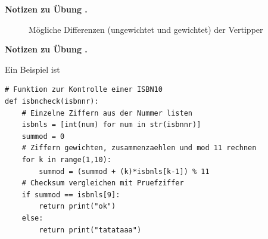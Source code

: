 \documentclass[%
11pt,%
twoside,%
titlepage,%
swissgerman,%
headsepline%
]{scrartcl}
\newcommand{\faReturnGray}{\textcolor{gray}{\faMailReply}} %
\theoremstyle{definition}
\theoremstyle{plain}
\newcommand{\concatueb}[1]{ueb:#1}%
\newcommand{\concatlsg}[1]{lsg:#1}%
\newcounter{uebcounter}[section]
\renewcommand{\theuebcounter}{\thesection.\arabic{uebcounter}}  %
\newenvironment{lsg}[1]{%
    \par\noindent\textbf{Notizen zu Übung \theuebcounter\label{\concatlsg{#1}}}
    \hfill\hyperref[\concatueb{#1}]{\faReturnGray}\par %
}{%
    \par%
}
\begin{document}
\begin{lsg}{isbn}
\begin{enumerate}[a)]
        \begin{figure}
            \centering
            \caption{Mögliche Differenzen (ungewichtet und gewichtet) der Vertipper}
            \label{fig:doublevertipper}
        \end{figure}
    \end{enumerate}
\end{lsg}
\begin{lsg}{isbnpython}
Ein Beispiel ist
 
 \begin{lstlisting}
# Funktion zur Kontrolle einer ISBN10
def isbncheck(isbnnr):
    # Einzelne Ziffern aus der Nummer listen
    isbnls = [int(num) for num in str(isbnnr)]
    summod = 0
    # Ziffern gewichten, zusammenzaehlen und mod 11 rechnen
    for k in range(1,10):
        summod = (summod + (k)*isbnls[k-1]) % 11
    # Checksum vergleichen mit Pruefziffer
    if summod == isbnls[9]:
        return print("ok")
    else:
        return print("tatataaa")
\end{lstlisting}
\end{lsg}
\end{document}

